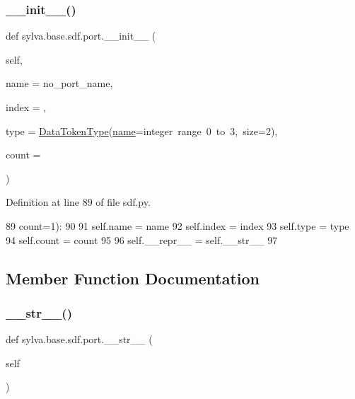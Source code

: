 \subsubsection{\texorpdfstring{\+\_\+\+\_\+init\+\_\+\+\_\+()}{\_\_init\_\_()}}
{\footnotesize\ttfamily def sylva.\+base.\+sdf.\+port.\+\_\+\+\_\+init\+\_\+\+\_\+ (\begin{DoxyParamCaption}\item[{}]{self,  }\item[{}]{name = {\ttfamily \textquotesingle{}no\+\_\+port\+\_\+name\textquotesingle{}},  }\item[{}]{index = {},  }\item[{}]{type = {\ttfamily \hyperlink{classsylva_1_1base_1_1sdf_1_1_data_token_type}{Data\+Token\+Type}(\hyperlink{classsylva_1_1base_1_1sdf_1_1port_ace0eb23bb9f3e4a75e6a94f0961a6f99}{name}=\textquotesingle{}integer~range~0~to~3\textquotesingle{},~size=2)},  }\item[{}]{count = {} }\end{DoxyParamCaption})}



Definition at line 89 of file sdf.\+py.


\begin{DoxyCode}
89                      count=1):
90 
91             self.name = name
92             self.index = index
93             self.type = type
94             self.count = count
95 
96             self.\_\_repr\_\_ = self.\_\_str\_\_
97 
\end{DoxyCode}


\subsection{Member Function Documentation}
\mbox{\label{classsylva_1_1base_1_1sdf_1_1port_a81a42bad6d299ec55b3d1482439d452f}} 
\subsubsection{\texorpdfstring{\+\_\+\+\_\+str\+\_\+\+\_\+()}{\_\_str\_\_()}}
{\footnotesize\ttfamily def sylva.\+base.\+sdf.\+port.\+\_\+\+\_\+str\+\_\+\+\_\+ (\begin{DoxyParamCaption}\item[{}]{self }\end{DoxyParamCaption})}



